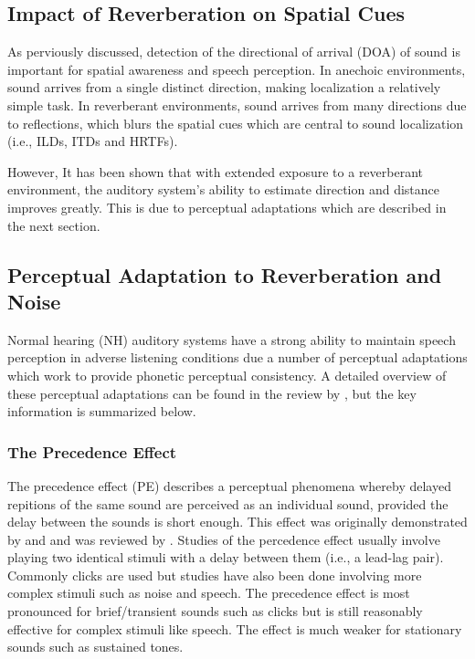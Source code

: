 \subsection{Impact of Reverberation on Spatial Cues} \label{section:reverb_spatial_cues}

As perviously discussed, detection of the directional of arrival (DOA) of sound is important for spatial awareness and speech perception. In anechoic environments, sound arrives from a single distinct direction, making localization a relatively simple task. In reverberant environments, sound arrives from many directions due to reflections, which blurs the spatial cues which are central to sound localization (i.e., ILDs, ITDs and HRTFs).

However, It has been shown that with extended exposure to a reverberant environment, the auditory system's ability to estimate direction and distance improves greatly. This is due to perceptual adaptations which are described in the next section.

\subsection{Perceptual Adaptation to Reverberation and Noise} \label{perceptual_adaptations}

Normal hearing (NH) auditory systems have a strong ability to maintain speech perception in adverse listening conditions due a number of perceptual adaptations which work to provide phonetic perceptual consistency. A detailed overview of these perceptual adaptations can be found in the review by \cite{tsironis2024adaptation}, but the key information is summarized below.

\subsubsection{The Precedence Effect}

The precedence effect (PE) describes a perceptual phenomena whereby delayed repitions of the same sound are perceived as an individual sound, provided the delay between the sounds is short enough. This effect was originally demonstrated by \cite{wallach1949precedence} and \cite{haas1951einflubeta} and was reviewed by \cite{litovsky1999precedence}. Studies of the percedence effect usually involve playing two identical stimuli with a delay between them (i.e., a lead-lag pair). Commonly clicks are used but studies have also been done involving more complex stimuli such as noise and speech. The precedence effect is most pronounced for brief/transient sounds such as clicks but is still reasonably effective for complex stimuli like speech. The effect is much weaker for stationary sounds such as sustained tones. 

